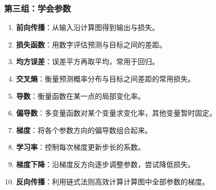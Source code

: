 \subsubsection{第三组：学会参数}
\begin{enumerate}[leftmargin=2.5em,itemsep=4pt,start=21]
\item \textbf{前向传播}：从输入沿计算图得到输出与损失。 
\item \textbf{损失函数}：用数字评估预测与目标之间的差距。 
\item \textbf{均方误差}：误差平方再取平均，常用于回归。 
\item \textbf{交叉熵}：衡量预测概率分布与目标之间差距的常用损失。 
\item \textbf{导数}：衡量函数在某一点的局部变化率。 
\item \textbf{偏导数}：多变量函数对某个变量求变化率，其他变量暂时固定。 
\item \textbf{梯度}：将各个参数方向的偏导数组合起来。 
\item \textbf{学习率}：控制每次梯度更新步长的系数。 
\item \textbf{梯度下降}：沿梯度反方向逐步调整参数，尝试降低损失。 
\item \textbf{反向传播}：利用链式法则高效计算计算图中全部参数的梯度。 
\end{enumerate}

